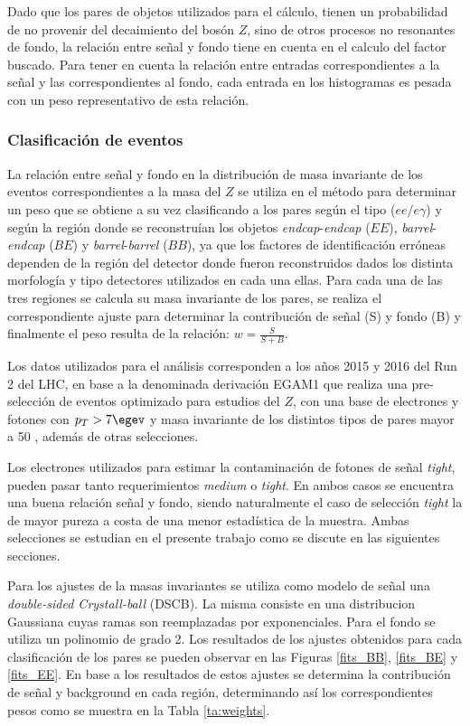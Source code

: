 Dado que los pares de objetos utilizados para el cálculo, tienen un probabilidad de no provenir del decaimiento del bosón $Z$, sino de otros procesos no resonantes de fondo, la relación entre señal y fondo tiene en cuenta en el calculo del factor buscado.
Para tener en cuenta la relación entre entradas correspondientes a la señal y las correspondientes al fondo, cada entrada en los histogramas es pesada con un peso representativo de esta relación.


\subsubsection{Clasificación de eventos}

La relación entre señal y fondo en la distribución de masa invariante de los eventos correspondientes a la masa del $Z$ se utiliza en el método para determinar un peso que se obtiene a su vez clasificando a los pares según el tipo ($ee/e\gamma$) y según la región donde se reconstruían los objetos \textit{endcap}-\textit{endcap} ($EE$), \textit{barrel}-\textit{endcap} ($BE$) y \textit{barrel}-\textit{barrel} ($BB$), ya que los factores de identificación erróneas dependen de la región del detector donde fueron reconstruidos dados los distinta morfología y tipo detectores utilizados en cada una ellas. Para cada una de las tres regiones se calcula su masa invariante de los pares, se realiza el correspondiente ajuste para determinar la contribución de señal (S) y fondo (B) y finalmente el peso resulta de la relación: $w=\frac{S}{S+B}$. 

Los datos utilizados para el análisis corresponden a los años 2015 y 2016 del Run 2 del LHC, en base a la denominada derivación EGAM1 que realiza una pre-selección de eventos optimizado para estudios del $Z$, con una base de electrones y fotones con $p_{T} > 7 \egev$ y masa invariante de los distintos tipos de pares mayor a 50 \egev, además de otras selecciones. %

Los electrones utilizados para estimar la contaminación de fotones de señal \textit{tight}, pueden pasar tanto requerimientos  \textit{medium} o \textit{tight}. En ambos casos se encuentra una buena relación señal y fondo, siendo naturalmente el caso de selección \textit{tight} la de mayor pureza a costa de una menor estadística de la muestra. Ambas selecciones se estudian en el presente trabajo como se discute en las siguientes secciones.

Para los ajustes de la masas invariantes se utiliza como modelo de señal una \textit{double-sided Crystall-ball} (DSCB). La misma consiste en una distribucion Gaussiana cuyas ramas son reemplazadas por exponenciales. Para el fondo se utiliza un polinomio de grado 2. Los resultados de los ajustes obtenidos para cada clasificación de los pares se pueden observar en las Figuras \ref{fits_BB}, \ref{fits_BE} y \ref{fits_EE}. En base a los resultados de estos ajustes se determina la contribución de señal y background en cada región, determinando así los correspondientes pesos como se muestra en la Tabla \ref{ta:weights}.


